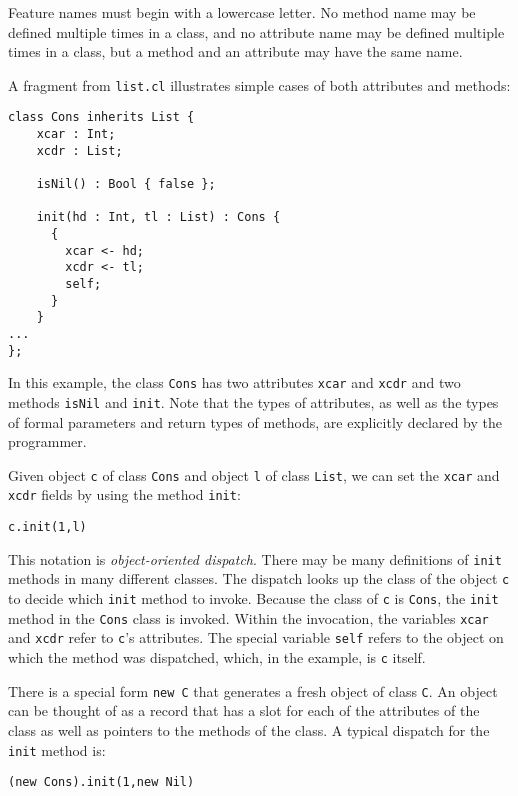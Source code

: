 \documentclass[]{article}
\begin{document}
Feature names must begin with a lowercase letter. No method name may be
defined multiple times in a class, and no attribute name may be defined
multiple times in a class, but a method and an attribute may have the
same name.

A fragment from \texttt{list.cl} illustrates simple cases of both
attributes and methods:

\begin{verbatim}
class Cons inherits List {
    xcar : Int;
    xcdr : List;

    isNil() : Bool { false };

    init(hd : Int, tl : List) : Cons {
      {
        xcar <- hd;
        xcdr <- tl;
        self;
      }
    }
...
};
\end{verbatim}

In this example, the class \texttt{Cons} has two attributes
\texttt{xcar} and \texttt{xcdr} and two methods \texttt{isNil} and
\texttt{init}. Note that the types of attributes, as well as the types
of formal parameters and return types of methods, are explicitly
declared by the programmer.

Given object \texttt{c} of class \texttt{Cons} and object \texttt{l} of
class \texttt{List}, we can set the \texttt{xcar} and \texttt{xcdr}
fields by using the method \texttt{init}:

\begin{verbatim}
c.init(1,l)
\end{verbatim}

This notation is \emph{object-oriented dispatch}. There may be many
definitions of \texttt{init} methods in many different classes. The
dispatch looks up the class of the object \texttt{c} to decide which
\texttt{init} method to invoke. Because the class of \texttt{c} is
\texttt{Cons}, the \texttt{init} method in the \texttt{Cons} class is
invoked. Within the invocation, the variables \texttt{xcar} and
\texttt{xcdr} refer to \texttt{c}'s attributes. The special variable
\texttt{self} refers to the object on which the method was dispatched,
which, in the example, is \texttt{c} itself.

There is a special form \texttt{new C} that generates a fresh object of
class \texttt{C}. An object can be thought of as a record that has a
slot for each of the attributes of the class as well as pointers to the
methods of the class. A typical dispatch for the \texttt{init} method
is:

\begin{verbatim}
(new Cons).init(1,new Nil)
\end{verbatim}
\end{document}
